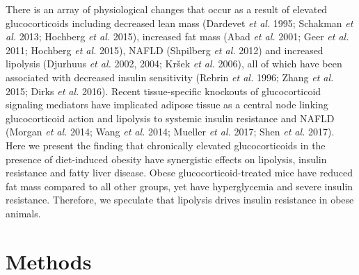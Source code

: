 \documentclass[11pt]{article} %
\begin{document}
There is an array of physiological changes that occur as a result of
elevated glucocorticoids including decreased lean mass (Dardevet
\emph{et al.} 1995; Schakman \emph{et al.} 2013; Hochberg \emph{et al.}
2015), increased fat mass (Abad \emph{et al.} 2001; Geer \emph{et al.}
2011; Hochberg \emph{et al.} 2015), NAFLD (Shpilberg \emph{et al.} 2012)
and increased lipolysis (Djurhuus \emph{et al.} 2002, 2004; Kršek
\emph{et al.} 2006), all of which have been associated with decreased
insulin sensitivity (Rebrin \emph{et al.} 1996; Zhang \emph{et al.}
2015; Dirks \emph{et al.} 2016). Recent tissue-specific knockouts of
glucocorticoid signaling mediators have implicated adipose tissue as a
central node linking glucocorticoid action and lipolysis to systemic
insulin resistance and NAFLD (Morgan \emph{et al.} 2014; Wang \emph{et
al.} 2014; Mueller \emph{et al.} 2017; Shen \emph{et al.} 2017). Here we
present the finding that chronically elevated glucocorticoids in the
presence of diet-induced obesity have synergistic effects on lipolysis,
insulin resistance and fatty liver disease. Obese glucocorticoid-treated
mice have reduced fat mass compared to all other groups, yet have
hyperglycemia and severe insulin resistance. Therefore, we speculate
that lipolysis drives insulin resistance in obese animals.

\section*{Methods}
\end{document}
